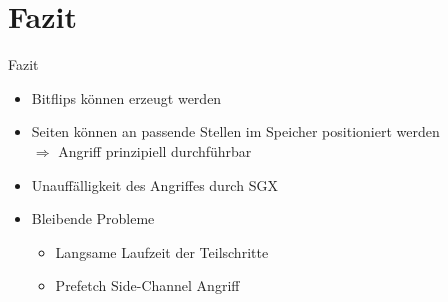 \documentclass[german,10pt,xcolor=colortbl,compress
]{beamer}
\begin{document}
\section{Fazit}
\begin{frame}{Fazit}
\begin{itemize}
\item Bitflips können erzeugt werden
\item Seiten können an passende Stellen im Speicher positioniert werden
\\$\Rightarrow$ Angriff prinzipiell durchführbar
\item Unauffälligkeit des Angriffes durch SGX
\item Bleibende Probleme
	\begin{itemize}
	\item Langsame Laufzeit der Teilschritte
	\item Prefetch Side-Channel Angriff
	\end{itemize}
\end{itemize}
\end{frame}
	
	
\end{document}
